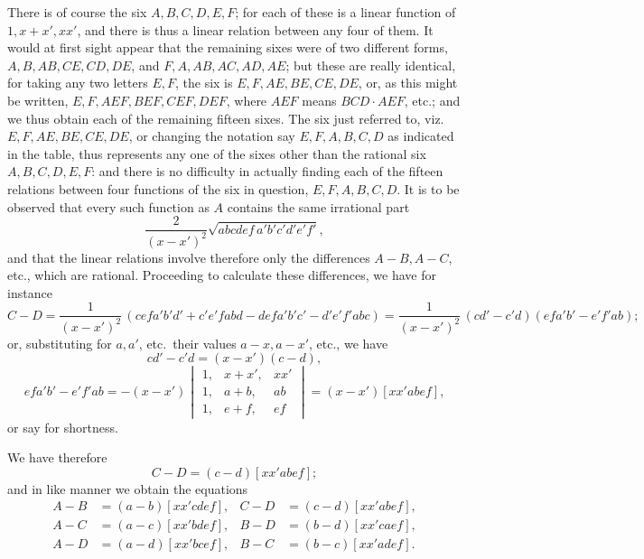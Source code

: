 \documentclass[11pt,a4paper]{article}
\begin{document}
\medskip

There is of course the six $A, B, C, D, E, F$; for each of these is a linear function of $1, x + x', xx'$, and there is thus a linear relation between any four of them. It would at first sight appear that the remaining sixes were of two different forms, $A, B, AB, CE, CD, DE$, and $F, A, AB, AC, AD, AE$; but these are really identical, for taking any two letters $E, F$, the six is $E, F, AE, BE, CE, DE$, or, as this might be written, $E, F, AEF, BEF, CEF, DEF$, where $AEF$ means $BCD \cdot AEF$, etc.; and we thus obtain each of the remaining fifteen sixes. The six just referred to, viz.\ $E, F, AE, BE, CE, DE$, or changing the notation say $E, F, A, B, C, D$ as indicated in the table, thus represents any one of the sixes other than the rational six $A, B, C, D, E, F$: and there is no difficulty in actually finding each of the fifteen relations between four functions of the six in question, $E, F, A, B, C, D$. It is to be observed that every such function as $A$ contains the same irrational part
\[
\frac{2}{(x - x')^{2}}\sqrt{abcdef\,a'b'c'd'e'f'},
\]
and that the linear relations involve therefore only the differences $A - B, A - C$, etc., which are rational. Proceeding to calculate these differences, we have for instance
\[
C - D = \frac{1}{(x - x')^{2}}\,(cefa'b'd' + c'e'fabd - defa'b'c' - d'e'f'abc) = \frac{1}{(x - x')^{2}}\,(cd' - c'd)(efa'b' - e'f'ab);
\]
or, substituting for $a, a'$, etc.\ their values $a - x, a - x'$, etc., we have
\[
cd' - c'd = (x - x')(c - d),
\]
\[
efa'b' - e'f'ab = -(x - x')\begin{vmatrix} 1, & x + x', & xx'\\ 1, & a + b, & ab\\ 1, & e + f, & ef \end{vmatrix} = (x - x')[xx'abef],
\]
or say for shortness.

\newpage


\noindent We have therefore
\[
C - D = (c - d)[xx'abef];
\]
and in like manner we obtain the equations
\[
\begin{aligned}
A - B &= (a - b)[xx'cdef], & C - D &= (c - d)[xx'abef],\\
A - C &= (a - c)[xx'bdef], & B - D &= (b - d)[xx'caef],\\
A - D &= (a - d)[xx'bcef], & B - C &= (b - c)[xx'adef].
\end{aligned}
\]
\end{document}
